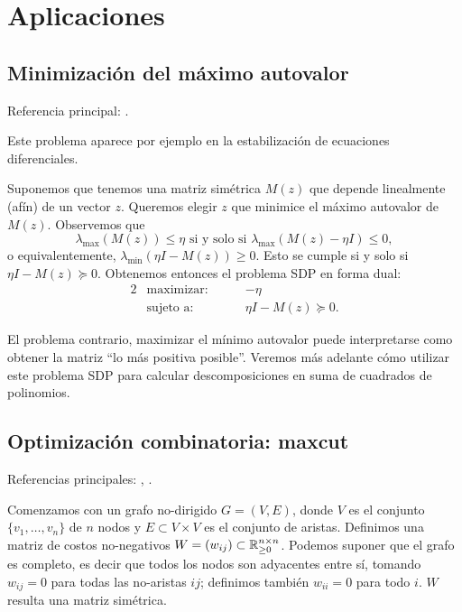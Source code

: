 \chapter{Aplicaciones}

\section{Minimización del máximo autovalor}

\noindent Referencia principal: \cite[Sección 3, Ejemplo 1]{Todd2001}.

Este problema aparece por ejemplo en la estabilización de ecuaciones diferenciales.

Suponemos que tenemos una matriz simétrica $M(z)$ que depende linealmente (afín) de un vector $z$. Queremos elegir $z$ que minimice el máximo autovalor de $M(z)$. Observemos que
$$
\lambda_{\max}(M(z)) \le \eta \text{ si y solo si } \lambda_{\max}(M(z) - \eta I) \le 0,
$$
o equivalentemente, $\lambda_{\min}(\eta I - M(z)) \ge 0$. Esto se cumple si y solo si $\eta I - M(z) \succeq 0$. Obtenemos entonces el problema SDP en forma dual:
\begin{alignat*}{2}
  & \text{maximizar: } & & -\eta \\
   & \text{sujeto a: } & \quad & \eta I - M(z) \succeq 0.
\end{alignat*}

El problema contrario, maximizar el mínimo autovalor puede interpretarse como obtener la matriz ``lo más positiva posible''. Veremos más adelante cómo utilizar este problema SDP para calcular descomposiciones en suma de cuadrados de polinomios.


\section{Optimizaci\'on combinatoria: maxcut}

\noindent Referencias principales: \cite[Sección 3, Ejemplo 9]{Todd2001}, \cite[Lección 14]{ODonell2008}.

Comenzamos con un grafo no-dirigido $G = (V, E)$, donde $V$ es el conjunto $\{v_1, \dots, v_n\}$ de $n$ nodos y $E \subset V \times V$ es el conjunto de aristas.
Definimos una matriz de costos no-negativos $W = (w_{ij}) \subset \mathbb{R}_{\ge 0}^{n \times n}$. Podemos suponer que el grafo es completo, es decir que todos los nodos son adyacentes entre sí, tomando $w_{ij} = 0$ para todas las no-aristas $ij$; definimos también $w_{ii} = 0$ para todo $i$. $W$ resulta una matriz simétrica.

